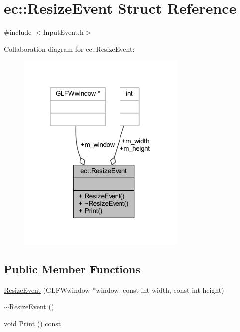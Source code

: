 \hypertarget{structec_1_1_resize_event}{}\section{ec\+:\+:Resize\+Event Struct Reference}
\label{structec_1_1_resize_event}


{\ttfamily \#include $<$Input\+Event.\+h$>$}



Collaboration diagram for ec\+:\+:Resize\+Event\+:\nopagebreak
\begin{figure}[H]
\begin{center}
\leavevmode
\includegraphics[width=231pt]{structec_1_1_resize_event__coll__graph}
\end{center}
\end{figure}
\subsection*{Public Member Functions}
\begin{DoxyCompactItemize}
\item 
\mbox{\hyperlink{structec_1_1_resize_event_a9e2b74fa922300d28f80fb37ef8aab79}{Resize\+Event}} (G\+L\+F\+Wwindow $\ast$window, const int width, const int height)
\item 
\mbox{\hyperlink{structec_1_1_resize_event_af55ba5e409720c2cf03cdb97347e3898}{$\sim$\+Resize\+Event}} ()
\item 
void \mbox{\hyperlink{structec_1_1_resize_event_acfee7a2ee86c0dbbc0a911a1a7a444c5}{Print}} () const
\end{DoxyCompactItemize}
